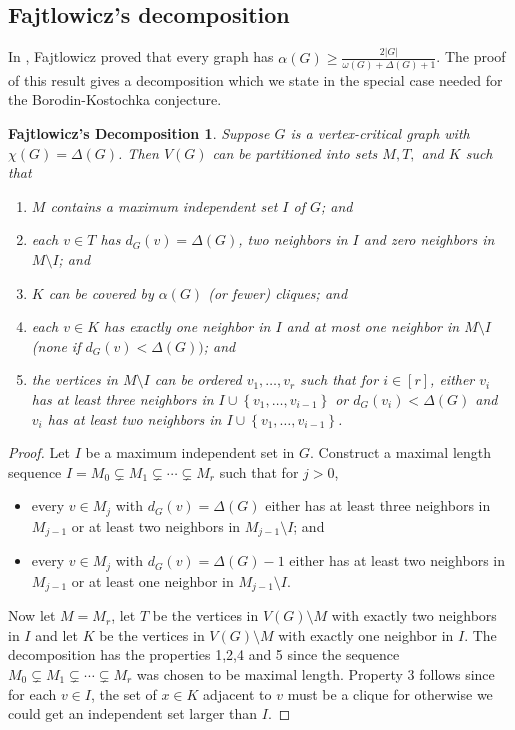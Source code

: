 \documentclass[12pt]{article}
\theoremstyle{plain}
\newtheorem*{FajtlowiczDecomp}{Fajtlowicz's Decomposition}
\theoremstyle{definition}
\theoremstyle{remark}
\newcommand{\set}[1]{\left\{ #1 \right\}}
\newcommand{\card}[1]{\left|#1\right|}
\newcommand{\irange}[1]{\left[#1\right]}
\begin{document}
\subsection{Fajtlowicz's decomposition}
In \cite{fajtlowicz1984independence}, Fajtlowicz proved that every graph has $\alpha(G) \ge \frac{2\card{G}}{\omega(G) + \Delta(G) + 1}$.  The proof of this result
gives a decomposition which we state in the special case needed for the Borodin-Kostochka conjecture.

\begin{FajtlowiczDecomp}
Suppose $G$ is a vertex-critical graph with $\chi(G) = \Delta(G)$.  Then $V(G)$ can be partitioned into sets $M, T,$ and $K$ such that
\begin{enumerate}
\item $M$ contains a maximum independent set $I$ of $G$; and
\item each $v \in T$ has $d_G(v) = \Delta(G)$, two neighbors in $I$ and zero neighbors in $M\setminus I$; and
\item $K$ can be covered by $\alpha(G)$ (or fewer) cliques; and
\item each $v \in K$ has exactly one neighbor in $I$ and at most one neighbor in $M\setminus I$ (none if $d_G(v) < \Delta(G))$; and
\item the vertices in $M \setminus I$ can be ordered $v_1, \ldots, v_r$ such that for $i \in \irange{r}$, either $v_i$ has at least three neighbors in $I \cup \set{v_1, \ldots, v_{i-1}}$
or $d_G(v_i) < \Delta(G)$ and $v_i$ has at least two neighbors in $I \cup \set{v_1, \ldots, v_{i-1}}$.
\end{enumerate}
\end{FajtlowiczDecomp}
\begin{proof}
Let $I$ be a maximum independent set in $G$.  Construct a maximal length sequence $I = M_0 \subsetneq M_1 \subsetneq \cdots \subsetneq M_r$ such that for $j>0$, 
\begin{itemize}
\item every $v \in M_j$ with $d_G(v) = \Delta(G)$ either has at least three neighbors in $M_{j-1}$ or at least two neighbors in $M_{j-1} \setminus I$; and
\item every $v \in M_j$ with $d_G(v) = \Delta(G) - 1$ either has at least two neighbors in $M_{j-1}$ or at least one neighbor in $M_{j-1} \setminus I$.
\end{itemize}
Now let $M = M_r$, let $T$ be the vertices in $V(G) \setminus M$ with exactly two neighbors in $I$ and let $K$ be the vertices in $V(G) \setminus M$ with exactly one neighbor in $I$.
The decomposition has the properties 1,2,4 and 5 since the sequence $M_0 \subsetneq M_1 \subsetneq \cdots \subsetneq M_r$ was chosen to be maximal length.  Property 3 follows since
for each $v \in I$, the set of $x \in K$ adjacent to $v$ must be a clique for otherwise we could get an independent set larger than $I$.
\end{proof}
\end{document}
